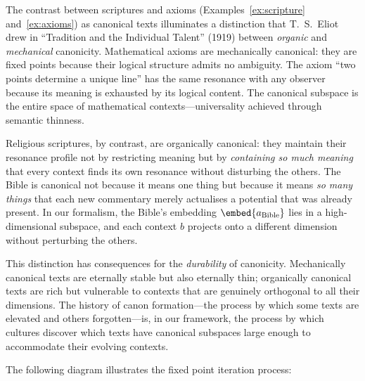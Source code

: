 \begin{interpretation}
\label{interp:ch10:eliot_tradition}
The contrast between scriptures and axioms (Examples~\ref{ex:scripture}
and~\ref{ex:axioms}) as canonical texts illuminates a distinction that
T.~S.~Eliot drew in ``Tradition and the Individual Talent'' (1919) between
\emph{organic} and \emph{mechanical} canonicity.  Mathematical axioms are
mechanically canonical: they are fixed points because their logical structure
admits no ambiguity.  The axiom ``two points determine a unique line'' has
the same resonance with any observer because its meaning is exhausted by its
logical content.  The canonical subspace is the entire space of mathematical
contexts---universality achieved through semantic thinness.

Religious scriptures, by contrast, are organically canonical: they maintain
their resonance profile not by restricting meaning but by \emph{containing
so much meaning} that every context finds its own resonance without
disturbing the others.  The Bible is canonical not because it means one thing
but because it means \emph{so many things} that each new commentary merely
actualises a potential that was already present.  In our formalism, the
Bible's embedding $\embed{a_{\mathrm{Bible}}}$ lies in a high-dimensional
subspace, and each context $b$ projects onto a different dimension without
perturbing the others.

This distinction has consequences for the \emph{durability} of canonicity.
Mechanically canonical texts are eternally stable but also eternally thin;
organically canonical texts are rich but vulnerable to contexts that are
genuinely orthogonal to all their dimensions.  The history of canon
formation---the process by which some texts are elevated and others
forgotten---is, in our framework, the process by which cultures discover
which texts have canonical subspaces large enough to accommodate their
evolving contexts.
\end{interpretation}



The following diagram illustrates the fixed point iteration process:

